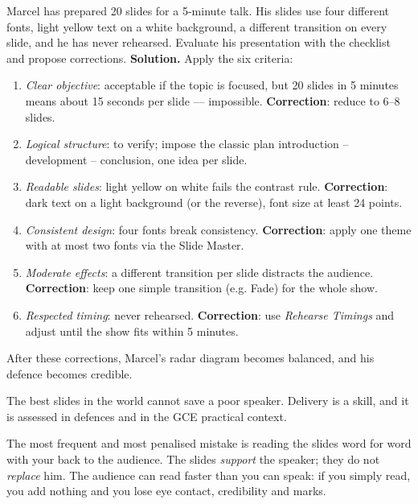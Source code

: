 \documentclass[11pt]{article}
\newcounter{popsec}
\newcounter{popsub}
\newcommand{\courssub}[1]{%
  \stepcounter{popsub}%
  \par\vspace{9pt}\noindent{\popxbold\fontsize{11.5}{13}\selectfont\color{popink}{\color{poporange}\thepopsec.\thepopsub}\hspace{6pt}#1}\par\nopagebreak\vspace{4pt}
}
\begin{document}
\begin{exoresolu}
Marcel has prepared 20 slides for a 5-minute talk. His slides use four different fonts, light yellow text on a white background, a different transition on every slide, and he has never rehearsed. Evaluate his presentation with the checklist and propose corrections.
\tcblower
\textbf{Solution.} Apply the six criteria:
\begin{enumerate}
\item \emph{Clear objective}: acceptable if the topic is focused, but 20 slides in 5 minutes means about 15 seconds per slide --- impossible. \textbf{Correction}: reduce to 6--8 slides.
\item \emph{Logical structure}: to verify; impose the classic plan introduction -- development -- conclusion, one idea per slide.
\item \emph{Readable slides}: light yellow on white fails the contrast rule. \textbf{Correction}: dark text on a light background (or the reverse), font size at least 24 points.
\item \emph{Consistent design}: four fonts break consistency. \textbf{Correction}: apply one theme with at most two fonts via the Slide Master.
\item \emph{Moderate effects}: a different transition per slide distracts the audience. \textbf{Correction}: keep one simple transition (e.g. Fade) for the whole show.
\item \emph{Respected timing}: never rehearsed. \textbf{Correction}: use \emph{Rehearse Timings} and adjust until the show fits within 5 minutes.
\end{enumerate}
After these corrections, Marcel's radar diagram becomes balanced, and his defence becomes credible.
\end{exoresolu}

\courssub{Delivery Skills}

The best slides in the world cannot save a poor speaker. Delivery is a skill, and it is assessed in defences and in the GCE practical context.

\begin{attention}
The most frequent and most penalised mistake is reading the slides word for word with your back to the audience. The slides \emph{support} the speaker; they do not \emph{replace} him. The audience can read faster than you can speak: if you simply read, you add nothing and you lose eye contact, credibility and marks.
\end{attention}
\end{document}
